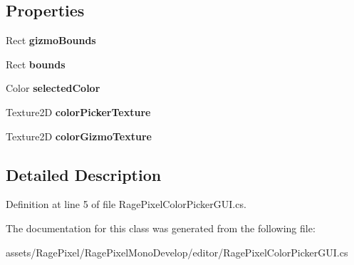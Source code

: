 \subsection*{Properties}
\begin{DoxyCompactItemize}
\item 
\hypertarget{class_rage_pixel_color_picker_g_u_i_ab9136fb7b16dea9346dd9af28e1906e9}{Rect {\bfseries gizmo\-Bounds}}\label{class_rage_pixel_color_picker_g_u_i_ab9136fb7b16dea9346dd9af28e1906e9}

\item 
\hypertarget{class_rage_pixel_color_picker_g_u_i_ab07f46366b7393742c1a8d982b5432a3}{Rect {\bfseries bounds}}\label{class_rage_pixel_color_picker_g_u_i_ab07f46366b7393742c1a8d982b5432a3}

\item 
\hypertarget{class_rage_pixel_color_picker_g_u_i_a6babf56a41db6fbfe93612d7f75cc4ea}{Color {\bfseries selected\-Color}}\label{class_rage_pixel_color_picker_g_u_i_a6babf56a41db6fbfe93612d7f75cc4ea}

\item 
\hypertarget{class_rage_pixel_color_picker_g_u_i_a1836eb93292f37b2f11b4179a02fa7f1}{Texture2\-D {\bfseries color\-Picker\-Texture}}\label{class_rage_pixel_color_picker_g_u_i_a1836eb93292f37b2f11b4179a02fa7f1}

\item 
\hypertarget{class_rage_pixel_color_picker_g_u_i_a5e872b0cf3cb0016bc71daa8e5257212}{Texture2\-D {\bfseries color\-Gizmo\-Texture}}\label{class_rage_pixel_color_picker_g_u_i_a5e872b0cf3cb0016bc71daa8e5257212}

\end{DoxyCompactItemize}


\subsection{Detailed Description}


Definition at line 5 of file Rage\-Pixel\-Color\-Picker\-G\-U\-I.\-cs.



The documentation for this class was generated from the following file\-:\begin{DoxyCompactItemize}
\item 
assets/\-Rage\-Pixel/\-Rage\-Pixel\-Mono\-Develop/editor/Rage\-Pixel\-Color\-Picker\-G\-U\-I.\-cs\end{DoxyCompactItemize}

